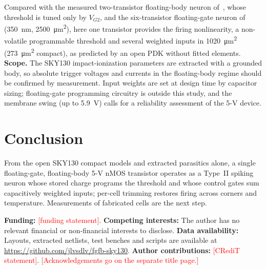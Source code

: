 \documentclass[pdflatex,sn-mathphys-num,iicol]{sn-jnl}
\newcommand{\TBD}[1]{\textcolor{red}{[#1]}}
\begin{document}
Compared with the measured two-transistor floating-body neuron of~\cite{pazos2025}, whose threshold is tuned only by $V_{G2}$, and the six-transistor floating-gate neuron of~\cite{bhattacharyya2025} (350~nm, \SI{2500}{\micro\meter^2}), here one transistor provides the firing nonlinearity, a non-volatile programmable threshold and several weighted inputs in 1020~\si{\micro\meter^2} (273~\si{\micro\meter^2} compact), as predicted by an open PDK without fitted elements. \textbf{Scope.} The SKY130 impact-ionization parameters are extracted with a grounded body, so absolute trigger voltages and currents in the floating-body regime should be confirmed by measurement. Input weights are set at design time by capacitor sizing; floating-gate programming circuitry is outside this study, and the membrane swing (up to \SI{5.9}{V}) calls for a reliability assessment of the 5-V device.

\section{Conclusion}\label{sec:conclusion}
From the open SKY130 compact models and extracted parasitics alone, a single floating-gate, floating-body 5-V nMOS transistor operates as a Type~II spiking neuron whose stored charge programs the threshold and whose control gates sum capacitively weighted inputs; per-cell trimming restores firing across corners and temperature. Measurements of fabricated cells are the next step.

\backmatter

\textbf{Funding:} \TBD{funding statement}. \textbf{Competing interests:} The author has no relevant financial or non-financial interests to disclose. \textbf{Data availability:} Layouts, extracted netlists, test benches and scripts are available at \url{https://github.com/jlvsdlv/fgfb-sky130}. \textbf{Author contributions:} \TBD{CRediT statement}. \TBD{Acknowledgements go on the separate title page.}


\end{document}
